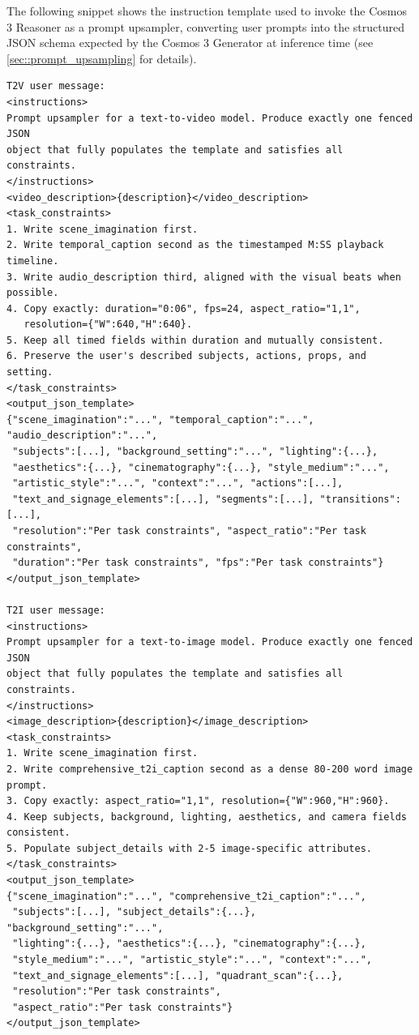 \documentclass{llmxive}
\begin{document}
The following snippet shows the instruction template used to invoke the Cosmos 3 Reasoner as a prompt upsampler, converting user prompts into the structured JSON schema expected by the Cosmos 3 Generator at inference time (see \cref{sec::prompt_upsampling} for details).

\begin{tcolorbox}[
    breakable,
    colback=black!2,
    colframe=nvidiagreen!75!white,
    boxrule=0.4pt,
    arc=1pt,
    left=4pt,
    right=4pt,
    top=4pt,
    bottom=4pt,
    title=Abridged Canonical Prompt-Template Examples
]
\begin{Verbatim}[breaklines=true,breakanywhere=true,fontsize=\scriptsize]
T2V user message:
<instructions>
Prompt upsampler for a text-to-video model. Produce exactly one fenced JSON
object that fully populates the template and satisfies all constraints.
</instructions>
<video_description>{description}</video_description>
<task_constraints>
1. Write scene_imagination first.
2. Write temporal_caption second as the timestamped M:SS playback timeline.
3. Write audio_description third, aligned with the visual beats when possible.
4. Copy exactly: duration="0:06", fps=24, aspect_ratio="1,1",
   resolution={"W":640,"H":640}.
5. Keep all timed fields within duration and mutually consistent.
6. Preserve the user's described subjects, actions, props, and setting.
</task_constraints>
<output_json_template>
{"scene_imagination":"...", "temporal_caption":"...", "audio_description":"...",
 "subjects":[...], "background_setting":"...", "lighting":{...},
 "aesthetics":{...}, "cinematography":{...}, "style_medium":"...",
 "artistic_style":"...", "context":"...", "actions":[...],
 "text_and_signage_elements":[...], "segments":[...], "transitions":[...],
 "resolution":"Per task constraints", "aspect_ratio":"Per task constraints",
 "duration":"Per task constraints", "fps":"Per task constraints"}
</output_json_template>

T2I user message:
<instructions>
Prompt upsampler for a text-to-image model. Produce exactly one fenced JSON
object that fully populates the template and satisfies all constraints.
</instructions>
<image_description>{description}</image_description>
<task_constraints>
1. Write scene_imagination first.
2. Write comprehensive_t2i_caption second as a dense 80-200 word image prompt.
3. Copy exactly: aspect_ratio="1,1", resolution={"W":960,"H":960}.
4. Keep subjects, background, lighting, aesthetics, and camera fields consistent.
5. Populate subject_details with 2-5 image-specific attributes.
</task_constraints>
<output_json_template>
{"scene_imagination":"...", "comprehensive_t2i_caption":"...",
 "subjects":[...], "subject_details":{...}, "background_setting":"...",
 "lighting":{...}, "aesthetics":{...}, "cinematography":{...},
 "style_medium":"...", "artistic_style":"...", "context":"...",
 "text_and_signage_elements":[...], "quadrant_scan":{...},
 "resolution":"Per task constraints",
 "aspect_ratio":"Per task constraints"}
</output_json_template>


\end{Verbatim}
\end{tcolorbox}
\end{document}
